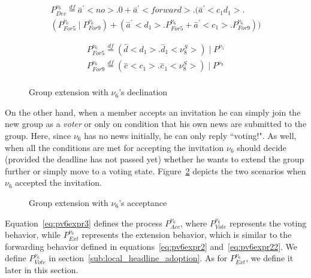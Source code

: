 \begin{equation} 
	\label{eq:pv6expr2} 
	\begin{gathered} 
		P^{\nu_6}_{Dec}\overset{df}{=}\overset{-}{a}^\prime<no>.0 + \overset{-}{a}^\prime<forward>.(\overset{-}{a}^\prime<c_1d_1>.\\(P^{\nu_6}_{For5}\mid P^{\nu_6}_{For9}) + (\overset{-}{a}^\prime<d_1>.P^{\nu_6}_{For5} + \overset{-}{a}^\prime<c_1>.P^{\nu_6}_{For9}))
	\end{gathered}
\end{equation}

\begin{equation} 
	\label{eq:pv6expr22} 
	\begin{gathered} 
		P^{\nu_6}_{For5}\overset{df}{=}(\overset{-}{d}<d_1>.\overset{-}{d}_1<\nu_8^S>)\mid P^{\nu_5}\\
		P^{\nu_6}_{For9}\overset{df}{=}(\overset{-}{c}<c_1>.\overset{-}{c}_1<\nu_8^S>)\mid P^{\nu_9}\\
	\end{gathered}
\end{equation}

\begin{figure}
	\centering 
	\caption{Group extension with $\nu_6$'s declination} 
	\label{fig:groupext-xv6}
\end{figure}

On the other hand, when a member accepts an invitation he can simply join the new group as a \emph{voter} or only on
condition that his own news are submitted to the group. Here, since $\nu_6$ has no news initially, he can only reply
``voting!". As well, when all the conditions are met for accepting the invitation $\nu_6$ should decide (provided the
deadline has not passed yet) whether he wants to extend the group further or simply move to a voting state.
Figure~\ref{fig:groupext-iv6} depicts the two scenarios when $\nu_6$ accepted the invitation.
\begin{figure} 
	\centering 
	\caption{Group extension with $\nu_6$'s acceptance}
	\label{fig:groupext-iv6}
\end{figure}
Equation~\ref{eq:pv6expr3} defines the process $P^{\nu_6}_{Acc}$, where $P^{\nu_6}_{Vote}$ represents the voting
behavior, while $P^{\nu_6}_{Ext}$ represents the extension behavior, which is similar to the forwarding behavior defined
in equations~\ref{eq:pv6expr2} and~\ref{eq:pv6expr22}. We define $P^{\nu_6}_{Vote}$ in section~\ref{sub:local_headline_adoption}. As
for $P^{\nu_6}_{Ext}$, we define it later in this section.

